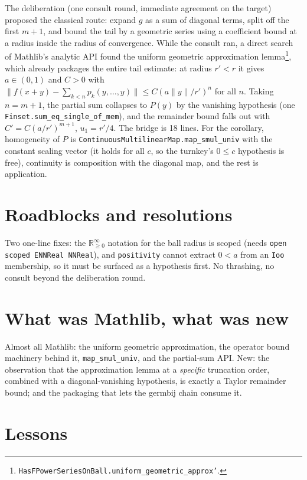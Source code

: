 \documentclass[11pt]{article}
\begin{document}
The deliberation (one consult round, immediate agreement on the target)
proposed the classical route: expand $g$ as a sum of diagonal terms,
split off the first $m+1$, and bound the tail by a geometric series using
a coefficient bound at a radius inside the radius of convergence. While
the consult ran, a direct search of Mathlib's analytic API found the
uniform geometric approximation lemma\footnote{%
\texttt{HasFPowerSeriesOnBall.uniform\_geometric\_approx'}.}, which
already packages the entire tail estimate: at radius $r' < r$ it gives $a \in
(0,1)$ and $C > 0$ with
$\|f(x+y) - \sum_{k<n} p_k(y,\ldots,y)\| \leq C (a \|y\|/r')^n$ for all
$n$. Taking $n = m + 1$, the partial sum collapses to $P(y)$ by the
vanishing hypothesis (one \texttt{Finset.sum\_eq\_single\_of\_mem}), and
the remainder bound falls out with $C' = C (a/r')^{m+1}$, $u_1 = r'/4$.
The bridge is 18 lines. For the corollary, homogeneity of $P$ is
\texttt{ContinuousMultilinearMap.map\_smul\_univ} with the constant
scaling vector (it holds for all $c$, so the turnkey's $0 \leq c$
hypothesis is free), continuity is composition with the diagonal map, and
the rest is application.

\section{Roadblocks and resolutions}

Two one-line fixes: the $\mathbb{R}_{\geq 0}^{\infty}$ notation for the
ball radius is scoped (needs \texttt{open scoped ENNReal NNReal}), and
\texttt{positivity} cannot extract $0 < a$ from an \texttt{Ioo}
membership, so it must be surfaced as a hypothesis first. No thrashing,
no consult beyond the deliberation round.

\section{What was Mathlib, what was new}

Almost all Mathlib: the uniform geometric approximation, the operator
bound machinery behind it, \texttt{map\_smul\_univ}, and the partial-sum
API. New: the observation that the approximation lemma at a
\emph{specific} truncation order, combined with a diagonal-vanishing
hypothesis, is exactly a Taylor remainder bound; and the packaging that
lets the germbij chain consume it.

\section{Lessons}
\end{document}
